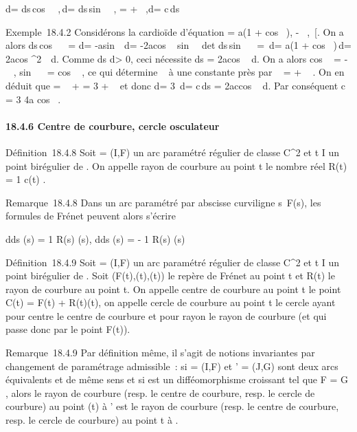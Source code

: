 d\rho = ds\,cos~
\alpha~,\quad \rho\,d\theta =
ds\,sin~ \alpha~, \phi = \theta +
\alpha~,\quad d\phi = c\,ds

Exemple~18.4.2 Considérons la cardioïde d'équation \rho = a(1
+ cos~ \theta), \theta \in{]} - \pi~,\pi~{[}. On a alors
ds\,cos~ \alpha~ = d\rho =
-asin~ \theta\,d\theta =
-2acos  \theta {}~
 sin  \theta {}~
\,d\theta et ds\,sin~
\alpha~ = \rho\,d\theta = a(1 + cos~
\theta)\,d\theta = 2acos ^2~
\theta {} \,d\theta. Comme  ds
\over d\theta \textgreater{} 0, ceci nécessite ds =
2acos  \theta {}~ d\theta. On a
alors cos \alpha~ = -\sin~
 \theta {} , sin~ \alpha~
= cos  \theta {}~ , ce qui
détermine \alpha~ à une constante près par \alpha~ = \theta {}
+ \pi~  . On en déduit que \phi = \alpha~ + \theta = 3\theta
{} + \pi~  et donc d\phi = 3
 \,d\theta = c\,ds =
2accos  \theta {}~ d\theta. Par
conséquent c = 3 \over 4a cos~
 \theta {}  .

\paragraph{18.4.6 Centre de courbure, cercle osculateur}

Définition~18.4.8 Soit \Gamma = (I,F) un arc paramétré régulier de classe
C^2 et t \in I un point birégulier de \Gamma. On appelle rayon de
courbure au point t le nombre réel R\Gamma(t) = 1
\over c\Gamma(t) .

Remarque~18.4.8 Dans un arc paramétré par abscisse curviligne
s\mapsto~F(s), les formules de Frénet peuvent alors
s'écrire

 d\vect \over ds (s) = 1
\over R(s) \vecn(s),
d\vecn \over ds (s) = - 1
\over R(s) \vect(s)

Définition~18.4.9 Soit \Gamma = (I,F) un arc paramétré régulier de classe
C^2 et t \in I un point birégulier de \Gamma. Soit
(F(t),\vect\Gamma(t),\vecn\Gamma(t))
le repère de Frénet au point t et R\Gamma(t) le rayon de courbure
au point t. On appelle centre de courbure au point t le point
C\Gamma(t) = F(t) +
R\Gamma(t)\vecn\Gamma(t), on appelle cercle
de courbure au point t le cercle ayant pour centre le centre de courbure
et pour rayon le rayon de courbure (et qui passe donc par le point
F(t)).

Remarque~18.4.9 Par définition même, il s'agit de notions invariantes
par changement de paramétrage admissible~: si \Gamma = (I,F) et \Gamma' = (J,G)
sont deux arcs équivalents et de même sens et si \theta est un
difféomorphisme croissant tel que F = G \cdot \theta, alors le rayon de courbure
(resp. le centre de courbure, resp. le cercle de courbure) au point \theta(t)
à \Gamma' est le rayon de courbure (resp. le centre de courbure, resp. le
cercle de courbure) au point t à \Gamma.

